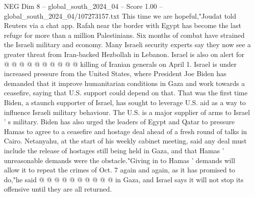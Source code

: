 \begin{textsample}{NEG Dim 8 – global\_south\_2024\_04 – Score 1.00 – global\_south\_2024\_04/107273157.txt}
This time we are hopeful,"Joudat told Reuters via a chat app.
Rafah near the border with Egypt has become the last refuge for more than a million Palestinians.
Six months of combat have strained the Israeli military and economy.
Many Israeli security experts say they now see a greater threat from Iran-backed Hezbollah in Lebanon.
Israel is also on alert for @ @ @ @ @ @ @ @ @ @ killing of Iranian generals on April 1.
Israel is under increased pressure from the United States, where President Joe Biden has demanded that it improve humanitarian conditions in Gaza and work towards a ceasefire, saying that U.S. support could depend on that.
That was the first time Biden, a staunch supporter of Israel, has sought to leverage U.S. aid as a way to influence Israeli military behaviour.
The U.S. is a major supplier of arms to Israel ' s military.
Biden has also urged the leaders of Egypt and Qatar to pressure Hamas to agree to a ceasefire and hostage deal ahead of a fresh round of talks in Cairo.
Netanyahu, at the start of his weekly cabinet meeting, said any deal must include the release of hostages still being held in Gaza, and that Hamas ' unreasonable demands were the obstacle."Giving in to Hamas ' demands will allow it to repeat the crimes of Oct. 7 again and again, as it has promised to do,"he said @ @ @ @ @ @ @ @ @ @ in Gaza, and Israel says it will not stop its offensive until they are all returned.

\end{textsample}
